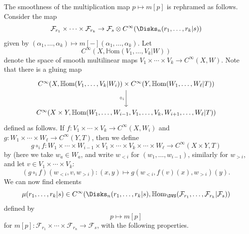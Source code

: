 The smoothness of the multiplication map $p\mapsto m[p]$ is rephramed as follows. Consider the map
\[
	\mathcal{F} _{r_1} \times \cdots \times \mathcal{F} _{r_k}  \to \mathcal{F} _s \otimes C^\infty (\Disks_n(r_1, \ldots , r_k | s))
\]
given by $(\alpha _1, \ldots , \alpha _k)\mapsto m[-](\alpha _1, \ldots , \alpha _k)$. Let
\[
	C^\infty(X,\mathbb{H} \mathrm{om}(V_1, \ldots , V_k| W ) ) 
\]
denote the space of smooth multilinear maps $V_1 \times \cdots \times V_k \to C^\infty(X,W) $. Note that there is a gluing map
\[
	\begin{tikzcd}[row sep = 2.5em, column sep = 2.5em]
	C^\infty (X,\mathbb{H} \mathrm{om}(V_1, \ldots , V_k | W_i) )\times C^\infty(Y, \mathbb{H} \mathrm{om}(W_1, \ldots , W_{\ell } | T) ) \ar[" \circ _i "', d]  \\
	C^\infty(X\times Y, \mathbb{H} \mathrm{om}(W_1, \ldots , W_{i-1} ,V_1, \ldots ,V_k, W_{i+1} , \ldots , W_{\ell } | T) ) 
\end{tikzcd}
\]
defined as follows. If $f : V_1 \times \cdots \times V_k \to C^\infty(X,W_i) $ and $g : W_1 \times \cdots \times W_{\ell } \to C^\infty(Y,T) $, then we define
\[
	g\circ _if : W_1 \times \cdots \times W_{i-1} \times V_1 \times \cdots \times V_k \times \cdots \times W_{\ell }  \to C^\infty(X\times Y, T) 
\]
by (here we take $w_a\in W_a$, and write $w_{<i} $ for $(w_1, \ldots , w_{i-1} )$, similarly for $w_{> i} $, and let $v\in V_1 \times \cdots \times V_k$:
\[
	(g\circ _if)(w_{<i} , v, w_{>i}) : (x,y) \mapsto g(w_{<i} , f(v)(x), w_{>i})(y)
.\]
We can now find elements
\[
	\mu (r_1, \ldots , r_k | s)\in C^\infty(\Disks_n(r_1, \ldots , r_k | s), \mathbb{H} \mathrm{om}_{\DVS } (\mathcal{F} _{r_1} , \ldots , \mathcal{F} _{r_k} | \mathcal{F} _s)) 
\]
defined by
\[
	p\mapsto m[p]
\]
for $m[p] : \mathcal{F} _{r_1} \times \cdots \times \mathcal{F} _{r_n}  \to \mathcal{F} _s$, with the following properties.

